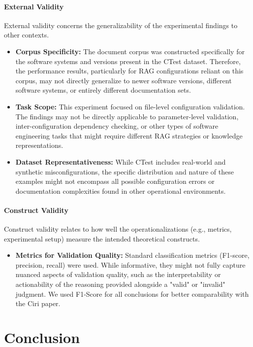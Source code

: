 \paragraph{External Validity}
External validity concerns the generalizability of the experimental findings to other contexts.

\begin{itemize}
    \item \textbf{Corpus Specificity:} The document corpus was constructed specifically for the software systems and versions present in the CTest dataset. Therefore, the performance results, particularly for RAG configurations reliant on this corpus, may not directly generalize to newer software versions, different software systems, or entirely different documentation sets.
    \item \textbf{Task Scope:} This experiment focused on file-level configuration validation. The findings may not be directly applicable to parameter-level validation, inter-configuration dependency checking, or other types of software engineering tasks that might require different RAG strategies or knowledge representations.
    \item \textbf{Dataset Representativeness:} While CTest includes real-world and synthetic misconfigurations, the specific distribution and nature of these examples might not encompass all possible configuration errors or documentation complexities found in other operational environments.
\end{itemize}

\paragraph{Construct Validity}
Construct validity relates to how well the operationalizations (e.g., metrics, experimental setup) measure the intended theoretical constructs.
\begin{itemize}
   \item \textbf{Metrics for Validation Quality:} Standard classification metrics (F1-score, precision, recall) were used. While informative, they might not fully capture nuanced aspects of validation quality, such as the interpretability or actionability of the reasoning provided alongside a "valid" or "invalid" judgment. We used F1-Score for all conclusions for better comparability with the Ciri paper.
\end{itemize}

\section{Conclusion} \label{sec:exp_conclusion}

